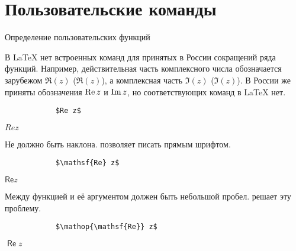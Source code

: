 \section{Пользовательские команды}

\begin{frame}[fragile]{Определение пользовательских функций}

	В \LaTeX{} нет встроенных команд для принятых в России сокращений ряда функций. Например, действительная часть комплексного числа обозначается зарубежом $\Re(z)$ (\texttt{$\Re(z)$}), а комплексная часть $\Im(z)$ (\texttt{$\Im(z)$}). В России же приняты обозначения $\mathop{\mathrm{Re}}\nolimits z$ и $\operatorname{Im} z$, но соответствующих команд в \LaTeX{} нет.
	
	
	\begin{minipage}{0.49\textwidth}
		\begin{verbatim}
			$Re z$
		\end{verbatim}
	\end{minipage}
	\begin{minipage}{0.49\textwidth}
		\begin{center}
			$Re z$
		\end{center}
	\end{minipage}
	
	Не должно быть наклона. \texttt{\mathsf} позволяет писать прямым шрифтом.
	
	\begin{minipage}{0.49\textwidth}
		\begin{verbatim}
			$\mathsf{Re} z$
		\end{verbatim}
	\end{minipage}
	\begin{minipage}{0.49\textwidth}
		\begin{center}
			$\mathsf{Re} z$
		\end{center}
	\end{minipage}

	Между функцией и её аргументом должен быть небольшой пробел.  \texttt{\mathop} решает эту проблему.

	\begin{minipage}{0.49\textwidth}
		\begin{verbatim}
			$\mathop{\mathsf{Re}} z$
		\end{verbatim}
	\end{minipage}
	\begin{minipage}{0.49\textwidth}
		\begin{center}
			$\mathop{\mathsf{Re}} z$
		\end{center}
	\end{minipage}
	
\end{frame}

